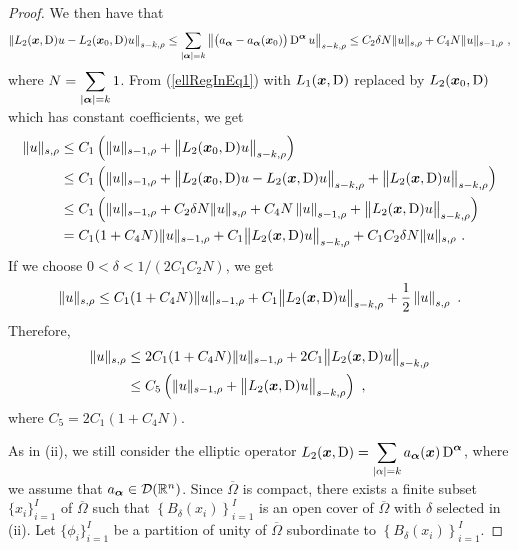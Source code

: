 \begin{proof}
We then have that
\[
\left\| L_2({\bm{x}},\operatorname{D}) u - L_2({\bm{x}}_0,\operatorname{D}) u\right\|_{s-k,\rho}
\leq \sum_{|{\bm{\alpha}}|=k} \left\| \big(a_{{\bm{\alpha}}}
- a_{{\bm{\alpha}}}({\bm{x}}_0)\big)
\operatorname{D}^{{\bm{\alpha}}} u \right\|_{s-k,\rho}
\leq C_2 \delta N \| u \|_{s,\rho}
+C_4 N \| u \|_{s-1,\rho} \ ,
\]
where $\displaystyle N = \sum_{|{\bm{\alpha}}|=k} 1$.  From
(\ref{ellRegInEq1}) with $L_1({\bm{x}},\operatorname{D})$ replaced by
$L_2({\bm{x}}_0,\operatorname{D})$ which has constant coefficients, we get
\begin{align*}
\|u\|_{s,\rho}
&\leq C_1 \left( \|u\|_{s-1,\rho} +
\big\|L_2({\bm{x}}_0,\operatorname{D})u\big\|_{s-k,\rho}\right) \\
&\leq C_1 \left( \|u\|_{s-1,\rho} +
\big\|L_2({\bm{x}}_0,\operatorname{D})u - L_2({\bm{x}},\operatorname{D})u\big\|_{s-k,\rho}
+\big\|L_2({\bm{x}},\operatorname{D})u\big\|_{s-k,\rho}\right) \\
&\leq C_1 \left( \|u\|_{s-1,\rho} + C_2 \delta N \| u \|_{s,\rho}
+C_4 N \left\| u \right\|_{s-1,\rho} 
+\big\|L_2({\bm{x}},\operatorname{D})u\big\|_{s-k,\rho}\right) \\
& = C_1 (1+C_4 N) \|u\|_{s-1,\rho} +
C_1 \big\|L_2({\bm{x}},\operatorname{D})u\big\|_{s-k,\rho}
+ C_1 C_2 \delta N \| u \|_{s,\rho} \ .
\end{align*}
If we choose $0<\delta < 1/(2C_1C_2 N)$, we get
\[
\|u\|_{s,\rho}
\leq C_1 (1+C_4 N) \|u\|_{s-1,\rho} +
C_1 \big\|L_2({\bm{x}},\operatorname{D})u\big\|_{s-k,\rho}
+ \frac{1}{2} \left\| u \right\|_{s,\rho} \ .
\]
Therefore,
\begin{equation} \label{ellRegInEq3}
\begin{split}
\|u\|_{s,\rho}
&\leq 2 C_1 (1+C_4 N) \|u\|_{s-1,\rho} +
2C_1 \big\|L_2({\bm{x}},\operatorname{D})u\big\|_{s-k,\rho} \\
&\leq C_5 \left( \|u\|_{s-1,\rho} +
\big\|L_2({\bm{x}},\operatorname{D})u\big\|_{s-k,\rho} \right) \ ,
\end{split}
\end{equation}
where $\displaystyle C_5 = 2C_1(1+C_4N)$.

 As in (ii), we still consider the elliptic operator
$\displaystyle L_2({\bm{x}},\operatorname{D})
= \sum_{|\alpha|= k} a_{{\bm{\alpha}}}({\bm{x}}) \operatorname{D}^{{\bm{\alpha}}}$,
where we assume that $a_{{\bm{\alpha}}} \in \mathcal{D}(\mathbb{R}^n)$.
Since $\overline{\Omega}$ is compact, there exists a finite subset 
$\displaystyle \{x_i\}_{i=1}^I$ of $\overline{\Omega}$ such that
$\displaystyle \left\{B_\delta(x_i)\right\}_{i=1}^I$ is an open cover
of $\overline{\Omega}$ with $\delta$ selected in (ii).  Let
$\displaystyle \{\phi_i\}_{i=1}^I$ be a
partition of unity of $\overline{\Omega}$ subordinate to
$\displaystyle \left\{B_\delta(x_i)\right\}_{i=1}^I$.


\end{proof}

